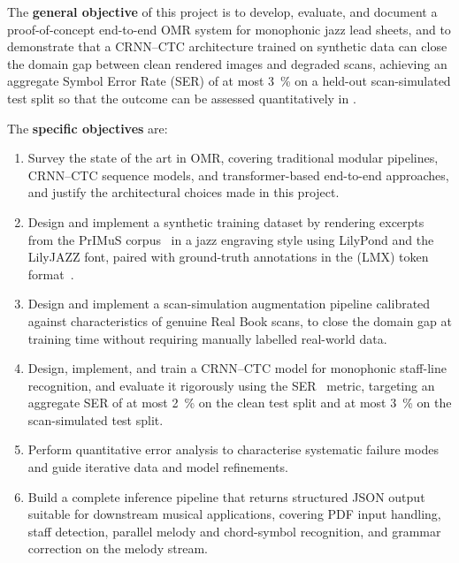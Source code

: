 The \textbf{general objective} of this project is to develop, evaluate, and document a
proof-of-concept end-to-end OMR system for monophonic jazz lead sheets, and to
demonstrate that a CRNN--CTC architecture trained on synthetic data can close the
domain gap between clean rendered images and degraded scans, achieving an aggregate
Symbol Error Rate (SER) of at most \SI{3}{\percent} on a held-out scan-simulated test
split so that the outcome can be assessed quantitatively in .

The \textbf{specific objectives} are:

\begin{enumerate}
    \item Survey the state of the art in OMR, covering traditional modular pipelines,
          CRNN--CTC sequence models, and transformer-based end-to-end approaches, and
          justify the architectural choices made in this project.

    \item Design and implement a synthetic training dataset by rendering excerpts from
          the PrIMuS corpus~\cite{PrIMuSDataset} in a jazz engraving style using
          LilyPond and the LilyJAZZ font, paired with ground-truth annotations in the
           (LMX) token format~\cite{OMRResearchLmx2025}.

    \item Design and implement a scan-simulation augmentation pipeline calibrated
          against characteristics of genuine Real Book scans, to close the domain gap at
          training time without requiring manually labelled real-world data.

    \item Design, implement, and train a CRNN--CTC model for monophonic staff-line
          recognition, and evaluate it rigorously using the SER~\cite{hajicOMRMetricsEvaluation2019}
          metric, targeting an aggregate SER of at most \SI{2}{\percent} on the clean
          test split and at most \SI{3}{\percent} on the scan-simulated test split.

    \item Perform quantitative error analysis to characterise systematic failure modes
          and guide iterative data and model refinements.

    \item Build a complete inference pipeline that returns structured JSON output
          suitable for downstream musical applications, covering PDF input handling,
          staff detection, parallel melody and chord-symbol recognition, and
          grammar correction on the melody stream.


\end{enumerate}
